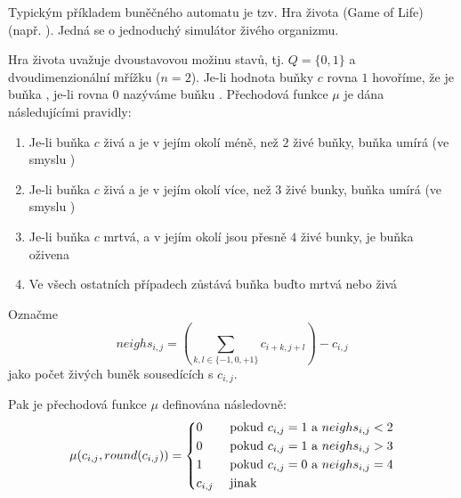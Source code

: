 \documentclass[a4paper,10pt]{article}
\begin{document}
\begin{example} \label{ex:GameOfLife}
  Typickým příkladem buněčného automatu je tzv. Hra života (Game of Life) (např. \cite{TofMar-CelAuMach+}). Jedná se o jednoduchý simulátor živého organizmu. 
  
  Hra života uvažuje dvoustavovou možinu stavů, tj. $Q = \{ 0, 1 \}$ a dvoudimenzionální mřížku ($n = 2$). Je-li hodnota buňky $c$ rovna $1$ hovoříme, že je buňka , je-li rovna $0$ nazýváme buňku . Přechodová funkce $\mu$ je dána následujícími pravidly:
  \begin{enumerate}
   \item Je-li buňka $c$ živá a je v jejím okolí méně, než $2$ živé buňky, buňka umírá (ve smyslu )
   \item Je-li buňka $c$ živá a je v jejím okolí více, než $3$ živé bunky, buňka umírá (ve smyslu )
   \item Je-li buňka $c$ mrtvá, a v jejím okolí jsou přesně $4$ živé bunky, je buňka oživena
   \item Ve všech ostatních případech zůstává buňka buďto mrtvá nebo živá 
  \end{enumerate}
  Označme 
  $$
    neighs_{i,j} = \left( \sum_{k,l \in \{-1, 0, +1\}} c_{i + k, j + l} \right) - c_{i,j}
  $$
  jako počet živých buněk sousedících s $c_{i,j}$. 
  
  Pak je přechodová funkce $\mu$ definována následovně:
  $$
    \mu(c_{i,j}, round(c_{i,j})) = 
      \begin{dcases}
       0 & \text{ pokud $c_{i,j} = 1$ a $neighs_{i,j} < 2$}	\\
       0 & \text{ pokud $c_{i,j} = 1$ a $neighs_{i,j} > 3$}	\\
       1 & \text{ pokud $c_{i,j} = 0$ a $neighs_{i,j} = 4$}	\\
       c_{i,j} & \text{ jinak}
      \end{dcases}
  $$
\end{example}
\end{document}
